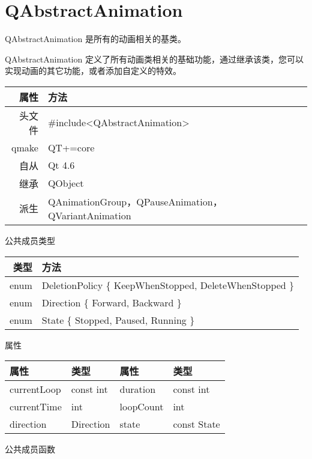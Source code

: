 \chapter{QAbstractAnimation}

QAbstractAnimation 是所有的动画相关的基类。

QAbstractAnimation 定义了所有动画类相关的基础功能，通过继承该类，您可以实现动画的其它功能，或者添加自定义的特效。

\begin{tabular}{|r|l|}
	\hline
	属性 & 方法 \\
	\hline
	头文件 & \#include<QAbstractAnimation>\\      
	\hline
	qmake & QT+=core\\      
	\hline
	自从 & Qt 4.6\\
	\hline
	继承&QObject \\
	\hline
	派生 & QAnimationGroup，QPauseAnimation，QVariantAnimation \\
	\hline
\end{tabular}

公共成员类型

\begin{tabular}{|r|l|}
	\hline
	类型 & 方法 \\
	\hline
	enum & DeletionPolicy \{ KeepWhenStopped, DeleteWhenStopped \}\\      
	\hline
	enum & Direction \{ Forward, Backward \}\\      
	\hline
	enum & State \{ Stopped, Paused, Running \}\\
	\hline
\end{tabular}

属性

\begin{tabular}{|l|l|l|l|}
	\hline
	属性 & 类型 &属性 &类型 \\
	\hline
		currentLoop & const int &duration &const int \\
	\hline
	currentTime	&int&	loopCount&	int\\
	\hline
	direction	&Direction	&state&	const State\\
	\hline
\end{tabular}


公共成员函数

